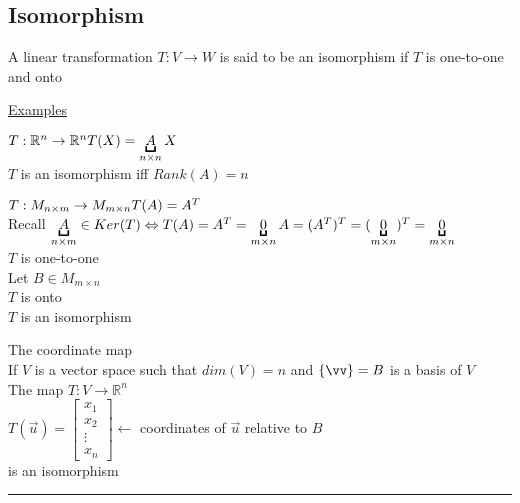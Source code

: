 \documentclass[12pt]{article}
\renewcommand{\v}[1]{\overrightarrow{#1}}
\newcommand\m[1]{\begin{bmatrix}#1\end{bmatrix}}
\newcommand{\real}[0]{\mathbb{R}}
\newenvironment{definition}{\block[Definition]}{\endblock}
\newcommand{\uu}[1]{\underbracket{#1}}
\newenvironment{examples}{\shownto{-,compact}\underline{Examples}\enumerate}{\endenumerate\divider\endshownto}
\newcommand{\bb}[1]{\left\{#1\right\}}
\newcommand{\divider}[0]{\par\textcolor{lightgray}{\rule{\textwidth}{0.1pt}}}
\begin{document}
\subsection{Isomorphism}

\begin{definition}
	A linear transformation $T: V \rightarrow W$ is said to be an isomorphism if $T$ is one-to-one and onto
\end{definition}

\begin{examples}
	\item $T: \real^n \rightarrow \real^n \\
	T(X) = \uu{A}_{n \times n} X$ \\
	$T$ is an isomorphism iff $Rank(A) = n$
	\item $T: M_{n \times m} \rightarrow M_{m \times n} \\
	T(A) = A^T$ \\
	Recall $\uu{A}_{n \times m} \in Ker(T) \Leftrightarrow T(A) = A^T = \uu{0}_{m \times n} \\
	A = (A^T)^T = (\uu{0}_{m \times n})^T = \uu{0}_{m \times n}$ \\
	$T$ is one-to-one \\
	Let $B \in M_{m \times n}$ \\
	$T$ is onto \\
	
	$T$ is an isomorphism
	
	\item The coordinate map \\
	If $V$ is a vector space such that $dim(V) = n$ and $\bb{\vv} = B$ is a basis of $V$ \\
	The map $T: V \rightarrow \real^n$ \\
	$T(\v{u}) = \m{x_1 \\ x_2 \\ \vdots \\ x_n} \leftarrow$ coordinates of $\v{u}$ relative to $B$ \\
	is an isomorphism
\end{examples}
\end{document}
